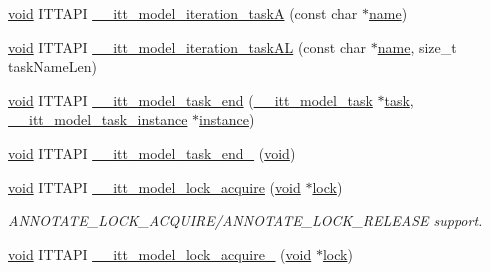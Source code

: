\begin{DoxyCompactItemize}
\item 
\hyperlink{ittnotify__static_8h_af941d56e55e3c5465135b60c4d6343ed}{void} I\-T\-T\-A\-P\-I \hyperlink{group__model_gabbd738c639cccc13b9c2cf6919ceb9d2}{\-\_\-\-\_\-itt\-\_\-model\-\_\-iteration\-\_\-task\-A} (const char $\ast$\hyperlink{ittnotify__static_8h_a1c34b35a4952969fef60192313bba34a}{name})
\item 
\hyperlink{ittnotify__static_8h_af941d56e55e3c5465135b60c4d6343ed}{void} I\-T\-T\-A\-P\-I \hyperlink{group__model_ga41daab15af2f1133454d2640ff305d51}{\-\_\-\-\_\-itt\-\_\-model\-\_\-iteration\-\_\-task\-A\-L} (const char $\ast$\hyperlink{ittnotify__static_8h_a1c34b35a4952969fef60192313bba34a}{name}, size\-\_\-t task\-Name\-Len)
\item 
\hyperlink{ittnotify__static_8h_af941d56e55e3c5465135b60c4d6343ed}{void} I\-T\-T\-A\-P\-I \hyperlink{group__model_ga2feec792701efd0cd53ea7dfb2d8a2a2}{\-\_\-\-\_\-itt\-\_\-model\-\_\-task\-\_\-end} (\hyperlink{group__model_ga96b1dc87978dfc08d2f7740f9d3d2196}{\-\_\-\-\_\-itt\-\_\-model\-\_\-task} $\ast$\hyperlink{ittnotify__static_8h_aed9673d42c4239c5498e39aad80df904}{task}, \hyperlink{group__model_ga649e02ad732b5bfc895a239353d09588}{\-\_\-\-\_\-itt\-\_\-model\-\_\-task\-\_\-instance} $\ast$\hyperlink{ittnotify__static_8h_ab279bddbbeb45ffb20ea9886348683b1}{instance})
\item 
\hyperlink{ittnotify__static_8h_af941d56e55e3c5465135b60c4d6343ed}{void} I\-T\-T\-A\-P\-I \hyperlink{group__model_ga8cf5327f38fb174cb59b648f17e417a9}{\-\_\-\-\_\-itt\-\_\-model\-\_\-task\-\_\-end\-\_} (\hyperlink{ittnotify__static_8h_af941d56e55e3c5465135b60c4d6343ed}{void})
\item 
\hyperlink{ittnotify__static_8h_af941d56e55e3c5465135b60c4d6343ed}{void} I\-T\-T\-A\-P\-I \hyperlink{group__model_ga36976a311ffa90e59ec5b9122bd79963}{\-\_\-\-\_\-itt\-\_\-model\-\_\-lock\-\_\-acquire} (\hyperlink{ittnotify__static_8h_af941d56e55e3c5465135b60c4d6343ed}{void} $\ast$\hyperlink{ittnotify__static_8h_ac33a428b292b874e62e0f98c2326b2c7}{lock})
\begin{DoxyCompactList}\small\item\em A\-N\-N\-O\-T\-A\-T\-E\-\_\-\-L\-O\-C\-K\-\_\-\-A\-C\-Q\-U\-I\-R\-E/\-A\-N\-N\-O\-T\-A\-T\-E\-\_\-\-L\-O\-C\-K\-\_\-\-R\-E\-L\-E\-A\-S\-E support. \end{DoxyCompactList}\item 
\hyperlink{ittnotify__static_8h_af941d56e55e3c5465135b60c4d6343ed}{void} I\-T\-T\-A\-P\-I \hyperlink{group__model_gaee0795006c12172e0726bbe1b052b64d}{\-\_\-\-\_\-itt\-\_\-model\-\_\-lock\-\_\-acquire\-\_} (\hyperlink{ittnotify__static_8h_af941d56e55e3c5465135b60c4d6343ed}{void} $\ast$\hyperlink{ittnotify__static_8h_ac33a428b292b874e62e0f98c2326b2c7}{lock})

\end{DoxyCompactItemize}
